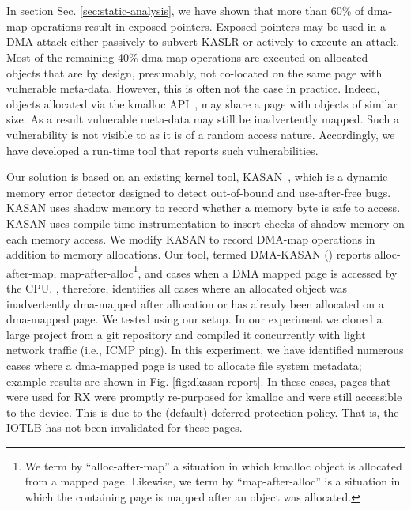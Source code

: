 \section{\dkasan}\label{sec:dma-kasan} 

In section Sec. \ref{sec:static-analysis}, we have shown that more than 60\% of dma-map operations result in exposed pointers. Exposed pointers may be used in a DMA attack either passively to subvert KASLR or actively to execute an attack. Most of the remaining 40\% dma-map operations are executed on allocated objects that are by design, presumably, not co-located on the same page with vulnerable meta-data. However, this is often not the case in practice.
Indeed, objects allocated via the kmalloc API~\cite{Cor07}, may share a page with objects of similar size. As a result vulnerable meta-data may still be inadvertently mapped. 
%
Such a vulnerability is not visible to \tool as it is of a random access nature. Accordingly, we have developed a run-time tool that reports such vulnerabilities. 

Our solution is based on an existing kernel tool, KASAN~\cite{kasan}, which is a dynamic memory error detector designed to detect out-of-bound and use-after-free bugs. KASAN uses shadow memory to record whether a memory byte is safe to access. KASAN uses compile-time instrumentation to insert checks of shadow memory on each memory access. 
We modify KASAN to record DMA-map operations in addition to memory allocations. Our tool, termed DMA-KASAN (\dkasan) reports alloc-after-map, map-after-alloc\footnote{We term by ``alloc-after-map'' a situation in which kmalloc object is allocated from a mapped page. Likewise, we term by ``map-after-alloc'' is a situation in which the containing page is mapped after an object was allocated.}, and cases when a DMA mapped page is accessed by the CPU. \dkasan, therefore, identifies all cases where an allocated object was inadvertently dma-mapped after allocation or has already been allocated on a dma-mapped page. We tested \dkasan using our setup. In our experiment we cloned a large project from a git repository and compiled it concurrently with light network traffic (i.e., ICMP ping). In this experiment, we have identified numerous cases where a dma-mapped page is used to allocate file system metadata; example results are shown in Fig. \ref{fig:dkasan-report}. 
%
In these cases, pages that were used for RX were promptly re-purposed\cite{hotcold} for kmalloc and were still accessible to the device. 
%
This is due to the (default) deferred protection policy. That is, the IOTLB has not been invalidated for these pages.

